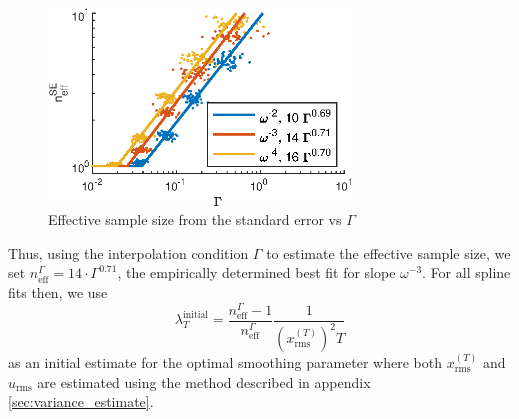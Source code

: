 \documentclass[10pt,journal]{IEEEtran}
\begin{document}
\begin{figure}
  \centerline{\includegraphics[width=19pc,angle=0]{figures/dofVsGamma}}
  
  \caption{Effective sample size from the standard error vs $\Gamma$}
  \label{dofVsGamma}
\end{figure}

Thus, using the interpolation condition $\Gamma$ to estimate the effective sample size, we set $n_{\textrm{eff}}^\Gamma = 14 \cdot \Gamma^{0.71}$, the empirically determined best fit for slope $\omega^{-3}$.  For all spline fits then, we use
\begin{equation}
\label{lambda_initial_guess}
\lambda^{\textrm{initial}}_T = \frac{n_{\textrm{eff}}^\Gamma-1}{n_{\textrm{eff}}^\Gamma} \frac{1}{ \left(x^{(T)}_{\textrm{rms}}\right)^2  T}
\end{equation}
as an initial estimate for the optimal smoothing parameter where both $x^{(T)}_{\textrm{rms}}$ and $u_\textrm{rms}$ are estimated using the method described in appendix \ref{sec:variance_estimate}.
\end{document}
